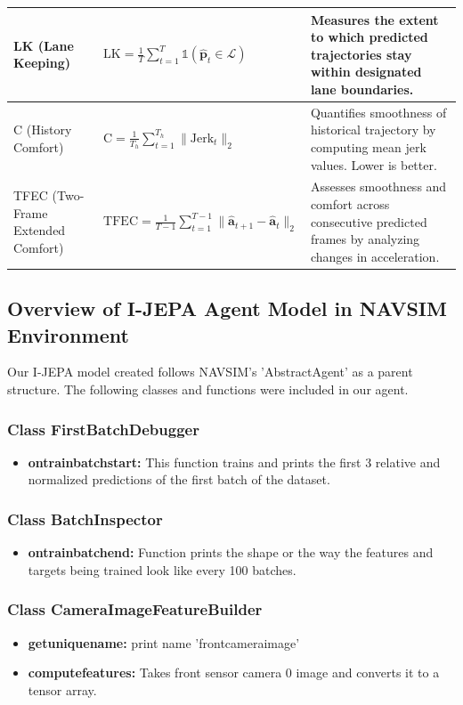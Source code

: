 \documentclass{article}
\begin{document}
\begin{longtable}{|p{2.2cm}|p{4.0cm}|p{7.2cm}|}
\hline
LK (Lane Keeping) &
$\displaystyle \text{LK} = \frac{1}{T} \sum_{t=1}^T \mathbb{1}\left( \hat{\mathbf{p}}_t \in \mathcal{L} \right)$ &
Measures the extent to which predicted trajectories stay within designated lane boundaries. \\
\hline
C (History Comfort) &
$\displaystyle \text{C} = \frac{1}{T_h} \sum_{t=1}^{T_h} \| \text{Jerk}_t \|_2$ &
Quantifies smoothness of historical trajectory by computing mean jerk values. Lower is better. \\
\hline
TFEC (Two-Frame Extended Comfort) &
$\displaystyle \text{TFEC} = \frac{1}{T-1} \sum_{t=1}^{T-1} \| \hat{\mathbf{a}}_{t+1} - \hat{\mathbf{a}}_{t} \|_2$ &
Assesses smoothness and comfort across consecutive predicted frames by analyzing changes in acceleration. \\
\hline
\end{longtable}
\subsection{Overview of I-JEPA Agent Model in NAVSIM Environment}
Our I-JEPA model created follows NAVSIM's 'AbstractAgent' as a parent structure. The following classes and functions were included in our agent. 

\subsubsection{Class FirstBatchDebugger}
\begin{itemize}
    \item \textbf{on\textunderscore train\textunderscore batch\textunderscore start:} This function trains and prints the first 3 relative and normalized predictions of the first batch of the dataset. 
\end{itemize}
\subsubsection{Class BatchInspector}
\begin{itemize}
    \item \textbf{on\textunderscore train\textunderscore batch\textunderscore end:} Function prints the shape or the way the features and targets being trained look like every 100 batches. 
\end{itemize}
\subsubsection{Class CameraImageFeatureBuilder}
\begin{itemize}
    \item \textbf{get\textunderscore unique\textunderscore name:} print name 'front\textunderscore camera\textunderscore image'
    \item \textbf{compute\textunderscore features:} Takes front sensor camera 0 image and converts it to a tensor array.
\end{itemize}
\end{document}
